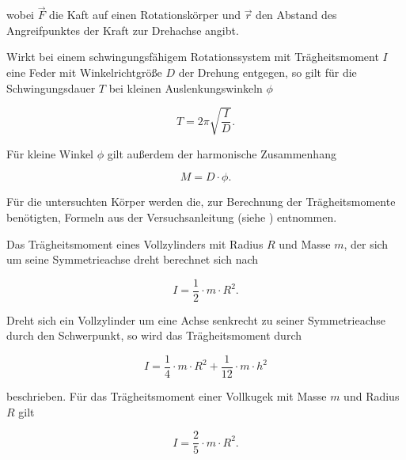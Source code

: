 \noindent wobei $\vec{F}$ die Kaft auf einen
Rotationskörper und $\vec{r}$ den Abstand des 
Angreifpunktes der Kraft zur Drehachse angibt.

Wirkt bei einem schwingungsfähigem Rotationssystem
mit Trägheitsmoment $I$
eine Feder mit Winkelrichtgröße $D$ der Drehung entgegen,
so gilt für die Schwingungsdauer $T$ bei kleinen 
Auslenkungswinkeln $\phi$

\begin{equation}
    T=2\pi \sqrt{\frac{I}{D}}.
\end{equation}

\noindent Für kleine Winkel $\phi$ gilt außerdem der
harmonische Zusammenhang

\begin{equation}
    M=D \cdot \phi.
\end{equation}

\noindent Für die untersuchten Körper werden 
die, zur Berechnung der Trägheitsmomente benötigten,
Formeln aus der Versuchsanleitung (siehe \cite{sample}) entnommen.

Das Trägheitsmoment eines Vollzylinders mit Radius $R$
und Masse $m$, der sich um seine
Symmetrieachse dreht berechnet sich nach

\begin{equation}
    I=\frac{1}{2} \cdot m \cdot R^2.
    \label{eq:zyl1}
\end{equation}

\noindent Dreht sich ein Vollzylinder um eine Achse senkrecht
zu seiner Symmetrieachse durch den Schwerpunkt, so wird das Trägheitsmoment durch

\begin{equation}
    I=\frac{1}{4} \cdot m \cdot R^2 + \frac{1}{12} \cdot m \cdot h^2
    \label{eq:zyl2}
\end{equation}

\noindent beschrieben. Für das Trägheitsmoment einer
Vollkugek  mit Masse $m$ und Radius $R$ gilt

\begin{equation}
    I=\frac{2}{5} \cdot m \cdot R^2.
    \label{eq:Kugel}
\end{equation}